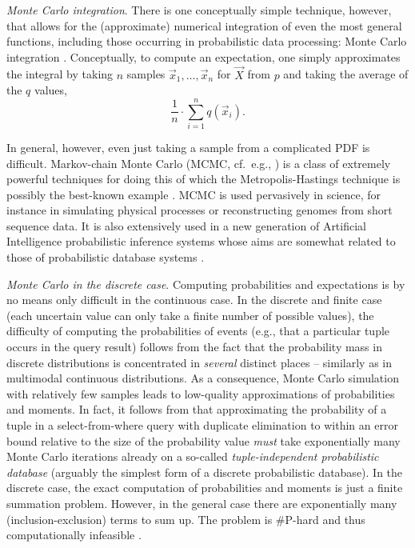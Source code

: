 {\em Monte Carlo integration}\/.
There is one conceptually simple technique,
however, that  allows for the (approximate) numerical integration of even  the most
general  functions, including those occurring in  probabilistic data  processing: Monte
Carlo integration \cite{montecarlo}. Conceptually, to compute an expectation, one simply
approximates   the  integral  by  taking $n$ samples
$\vec{x}_1, \dots, \vec{x}_n$ for
$\vec{X}$ from $p$  and  taking  the  average of the $q$ values,
%
\begin{equation}\label{eq:mc_expectation}
\frac{1}{n} \cdot \sum_{i=1}^n q(\vec{x}_i).
\end{equation}

In general, however, even just taking a sample from
a complicated PDF is difficult.  Markov-chain Monte Carlo (MCMC, cf.\ e.g.,
\cite{GRS1995}) is a class of extremely powerful
techniques for doing this of which the
Metropolis-Hastings technique is possibly the best-known example
\cite{metropolis,GRS1995}.
%
MCMC is used pervasively in science, for instance in
simulating  physical processes  or reconstructing  genomes  from short
sequence data.  It is also extensively used
in a new generation of Artificial Intelligence probabilistic inference
systems whose aims are somewhat related to those of probabilistic
database systems \cite{RD2006, BLOG}.





{\em Monte Carlo in the discrete case}\/.
Computing probabilities and expectations is by no means only difficult
in  the  continuous case.   In  the  discrete  and finite  case  (each
uncertain value can only take  a finite number of possible values),
the difficulty of computing  the probabilities of events (e.g., that a particular tuple
occurs in  the query result) follows  from the fact that  the probability
mass  in  discrete  distributions  is concentrated  in  {\em  several}
distinct   places   --   similarly   as   in   multimodal   continuous
distributions.   As   a  consequence,  Monte   Carlo  simulation  with
relatively few  samples leads  to low-quality approximations  of probabilities
and moments. In fact, it follows from
\cite{KL1983, KLM1989, GGH1998}
that approximating  the probability of a tuple  in a select-from-where
query with duplicate elimination to  within an error bound relative to
the size of the probability value {\em must}\/ take exponentially many
Monte Carlo  iterations already on a  so-called {\em tuple-independent
probabilistic database}\/
\cite{dalvi07efficient} (arguably the simplest form of a discrete probabilistic
database).
In the discrete case, the exact  computation of
probabilities  and moments  is just  a finite  summation  problem.  However, in the general case 
there  are exponentially  many (inclusion-exclusion)  terms to  sum up. The  problem  is  \#P-hard   and  thus  computationally
infeasible \cite{GGH1998,dalvi07efficient}.

